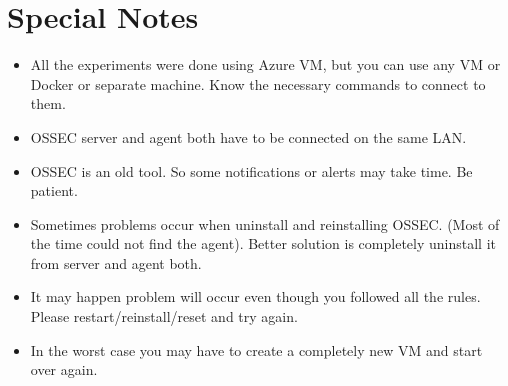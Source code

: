 \documentclass{article}
\begin{document}
\section{Special Notes}
\begin{itemize}
    \item All the experiments were done using Azure VM, but you can use any VM or Docker or separate machine. Know the necessary commands to connect to them.
    \item OSSEC server and agent both have to be connected on the same LAN.
    \item OSSEC is an old tool. So some notifications or alerts may take time. Be patient.
    \item Sometimes problems occur when uninstall and reinstalling OSSEC. (Most of the time could not find the agent). Better solution is completely uninstall it from server and agent both.
    \item It may happen problem will occur even though you followed all the rules. Please restart/reinstall/reset and try again.
    \item In the worst case you may have to create a completely new VM and start over again.
\end{itemize}




















% 
\end{document}
